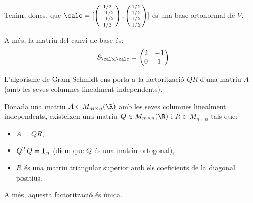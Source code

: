 \begin{exemple}
Tenim, doncs, que $\calc=[\smat{1/2\\-1/2\\-1/2\\1/2},\smat{1/2\\1/2\\1/2\\1/2}]$ és una base ortonormal de $V$.

A més, la matriu del canvi de base és:
\[
S_{\calb,\calc}=\begin{pmatrix} 2 & -1 \\ 0 & 1\end{pmatrix}
\]
\end{exemple}

L'algorisme de Gram-Schmidt ens porta a la factorització $QR$ d'una matriu $A$ (amb les seves columnes linealment independents).
\begin{teorema}
Donada una matriu $A\in M_{m\times n}(\R)$ amb les seves columnes linealment independents, existeixen una matriu $Q\in M_{m\times n}(\R)$ i $R\in M_{n\times n}$ tals que:
\begin{itemize}
    \item $A=QR$,
    \item $Q^T Q=\mathbf{1}_n$ (diem que $Q$ és una matriu ortogonal),
    \item $R$ és una matriu triangular superior amb els coeficients de la diagonal positius.
\end{itemize}
A més, aquesta factorització és única.
\end{teorema}
